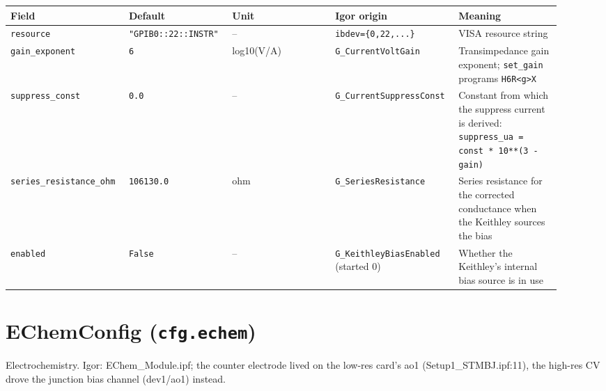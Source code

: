 \footnotesize\setlength{\LTleft}{0pt}\setlength{\LTright}{\fill}
\begin{longtable}{@{}>{\raggedright\arraybackslash}p{0.184\linewidth}>{\raggedright\arraybackslash}p{0.184\linewidth}>{\raggedright\arraybackslash}p{0.184\linewidth}>{\raggedright\arraybackslash}p{0.184\linewidth}>{\raggedright\arraybackslash}p{0.184\linewidth}@{}}
\toprule
\textbf{Field} & \textbf{Default} & \textbf{Unit} & \textbf{Igor origin} & \textbf{Meaning} \\
\midrule\endhead
\texttt{resource} & \texttt{"GPIB0::22::INSTR"} & -- & \texttt{ibdev=\{0,\discretionary{}{}{}22,\discretionary{}{}{}.\discretionary{}{}{}.\discretionary{}{}{}.\discretionary{}{}{}\}} & VISA resource string \\
\texttt{gain\_\discretionary{}{}{}exponent} & \texttt{6} & log10(V/A) & \texttt{G\_\discretionary{}{}{}Current\discretionary{}{}{}Volt\discretionary{}{}{}Gain} & Transimpedance gain exponent; \texttt{set\_\discretionary{}{}{}gain} programs \texttt{H6R<g>X} \\
\texttt{suppress\_\discretionary{}{}{}const} & \texttt{0.\discretionary{}{}{}0} & -- & \texttt{G\_\discretionary{}{}{}Current\discretionary{}{}{}Suppress\discretionary{}{}{}Const} & Constant from which the suppress current is derived: \texttt{suppress\_\discretionary{}{}{}ua = const * 10**(3 - gain)} \\
\texttt{series\_\discretionary{}{}{}resistance\_\discretionary{}{}{}ohm} & \texttt{106130.\discretionary{}{}{}0} & ohm & \texttt{G\_\discretionary{}{}{}Series\discretionary{}{}{}Resistance} & Series resistance for the corrected conductance when the Keithley sources the bias \\
\texttt{enabled} & \texttt{False} & -- & \texttt{G\_\discretionary{}{}{}Keithley\discretionary{}{}{}Bias\discretionary{}{}{}Enabled} (started 0) & Whether the Keithley's internal bias source is in use \\
\bottomrule
\end{longtable}
\normalsize

\section{EChemConfig (\texttt{cfg.\discretionary{}{}{}echem})}

Electrochemistry. Igor: EChem\_Module.ipf; the counter electrode lived on the low-res card's ao1 (Setup1\_STMBJ.ipf:11), the high-res CV drove the junction bias channel (dev1/ao1) instead.

